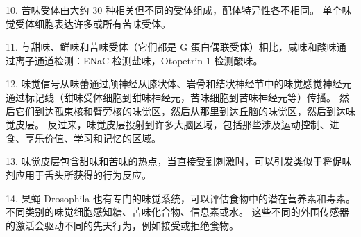 10. 苦味受体由大约 30 种相关但不同的受体组成，配体特异性各不相同。
单个味觉受体细胞表达许多或所有苦味受体。 


11. 与甜味、鲜味和苦味受体（它们都是 G 蛋白偶联受体）相比，咸味和酸味通过离子通道检测：ENaC 检测盐味，Otopetrin-1 检测酸味。 


12. 味觉信号从味蕾通过颅神经从膝状体、岩骨和结状神经节中的味觉感觉神经元通过标记线（甜味受体细胞到甜味神经元，苦味细胞到苦味神经元等）传播。
然后它们到达孤束核和臂旁核的味觉区，然后从那里到达丘脑的味觉区，然后到达味觉皮层。
反过来，味觉皮层投射到许多大脑区域，包括那些涉及运动控制、进食、享乐价值、学习和记忆的区域。


13. 味觉皮层包含甜味和苦味的热点，当直接受到刺激时，可以引发类似于将促味剂应用于舌头所获得的行为反应。 


14. 果蝇 Drosophila 也有专门的味觉系统，可以评估食物中的潜在营养素和毒素。
不同类别的味觉细胞感知糖、苦味化合物、信息素或水。 
这些不同的外围传感器的激活会驱动不同的先天行为，例如接受或拒绝食物。



